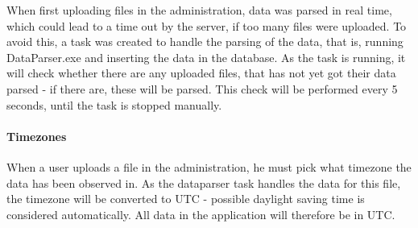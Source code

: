 When first uploading files in the administration, data was parsed in real time, which could lead to a time out by the server, if too many files were uploaded. To avoid this, a task was created to handle the parsing of the data, that is, running DataParser.exe and inserting the data in the database. As the task is running, it will check whether there are any uploaded files, that has not yet got their data parsed - if there are, these will be parsed. This check will be performed every 5 seconds, until the task is stopped manually.

\paragraph{Timezones}
When a user uploads a file in the administration, he must pick what timezone the data has been observed in. As the dataparser task handles the data for this file, the timezone will be converted to UTC - possible daylight saving time is considered automatically. All data in the application will therefore be in UTC.